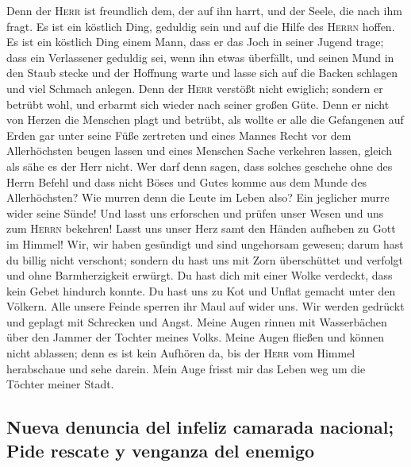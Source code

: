  Denn der \textsc{Herr} ist freundlich dem, der auf ihn
harrt, und der Seele, die nach ihm fragt.  Es ist ein
köstlich Ding, geduldig sein und auf die Hilfe des \textsc{Herrn}
hoffen.  Es ist ein köstlich Ding einem Mann, dass er das
Joch in seiner Jugend trage;  dass ein Verlassener
geduldig sei, wenn ihn etwas überfällt,  und seinen Mund
in den Staub stecke und der Hoffnung warte  und lasse
sich auf die Backen schlagen und viel Schmach anlegen. 
Denn der \textsc{Herr} verstößt nicht ewiglich;  sondern
er betrübt wohl, und erbarmt sich wieder nach seiner großen Güte.
 Denn er nicht von Herzen die Menschen plagt und betrübt,
 als wollte er alle die Gefangenen auf Erden gar unter
seine Füße zertreten  und eines Mannes Recht vor dem
Allerhöchsten beugen lassen  und eines Menschen Sache
verkehren lassen, gleich als sähe es der Herr nicht.  Wer
darf denn sagen, dass solches geschehe ohne des Herrn Befehl
 und dass nicht Böses und Gutes komme aus dem Munde des
Allerhöchsten?  Wie murren denn die Leute im Leben also?
Ein jeglicher murre wider seine Sünde!  Und lasst uns
erforschen und prüfen unser Wesen und uns zum \textsc{Herrn} bekehren!
 Lasst uns unser Herz samt den Händen aufheben zu Gott im
Himmel!  Wir, wir haben gesündigt und sind ungehorsam
gewesen; darum hast du billig nicht verschont;  sondern
du hast uns mit Zorn überschüttet und verfolgt und ohne Barmherzigkeit
erwürgt.  Du hast dich mit einer Wolke verdeckt, dass
kein Gebet hindurch konnte.  Du hast uns zu Kot und
Unflat gemacht unter den Völkern.  Alle unsere Feinde
sperren ihr Maul auf wider uns.  Wir werden gedrückt und
geplagt mit Schrecken und Angst.  Meine Augen rinnen mit
Wasserbächen über den Jammer der Tochter meines Volks. 
Meine Augen fließen und können nicht ablassen; denn es ist kein Aufhören
da,  bis der \textsc{Herr} vom Himmel herabschaue und
sehe darein.  Mein Auge frisst mir das Leben weg um die
Töchter meiner Stadt.

\hypertarget{nueva-denuncia-del-infeliz-camarada-nacional-pide-rescate-y-venganza-del-enemigo}{%
\subsection{Nueva denuncia del infeliz camarada nacional; Pide rescate y
venganza del
enemigo}\label{nueva-denuncia-del-infeliz-camarada-nacional-pide-rescate-y-venganza-del-enemigo}}

